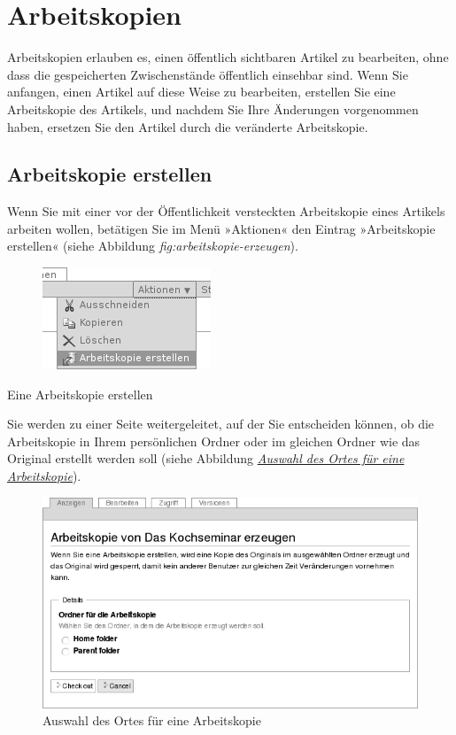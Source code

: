 \documentclass[a4paper,12pt,ngerman]{manual}
\begin{document}
\resetcurrentobjects
\hypertarget{--doc-umgang/bearbeitung}{}

\hypertarget{sec-arbeitskopien}{}\section{Arbeitskopien}

Arbeitskopien erlauben es, einen öffentlich sichtbaren Artikel zu
bearbeiten, ohne dass die gespeicherten Zwischenstände öffentlich
einsehbar sind. Wenn Sie anfangen, einen Artikel auf diese Weise zu
bearbeiten, erstellen Sie eine Arbeitskopie des Artikels, und nachdem
Sie Ihre Änderungen vorgenommen haben, ersetzen Sie den Artikel durch
die veränderte Arbeitskopie.


\hypertarget{sec-arbeitskopie-erstellen}{}\subsection{Arbeitskopie erstellen}

Wenn Sie mit einer vor der Öffentlichkeit versteckten Arbeitskopie eines
Artikels arbeiten wollen, betätigen Sie im Menü »Aktionen« den Eintrag
»Arbeitskopie erstellen« (siehe Abbildung \emph{fig:arbeitskopie-erzeugen}).
\hypertarget{fig-arbeitskopie-erzeugen}{}\begin{figure}[htbp]
\centering

\includegraphics{arbeitskopie-erzeugen.png}
\end{figure}

Eine Arbeitskopie erstellen

Sie werden zu einer Seite weitergeleitet, auf der Sie entscheiden können, ob
die Arbeitskopie in Ihrem persönlichen Ordner oder im gleichen Ordner wie das
Original erstellt werden soll (siehe
Abbildung \hyperlink{fig-arbeitskopie-wohin}{\emph{Auswahl des Ortes für eine Arbeitskopie}}).
\hypertarget{fig-arbeitskopie-wohin}{}\begin{figure}[htbp]
\centering

\includegraphics{arbeitskopie-wohin.png}
\caption{Auswahl des Ortes für eine Arbeitskopie}\end{figure}
\end{document}
